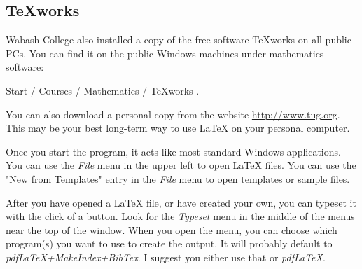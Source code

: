 \documentclass[titlepage]{article}                %
\theoremstyle{definition}
\theoremstyle{remark}
\begin{document}
%
%

\subsection{TeXworks}

Wabash College also installed a copy of the free software TeXworks on all
public PCs.  You can find it on the public Windows machines under mathematics
software: 
\begin{center}
Start / Courses / Mathematics / TeXworks .
\end{center}
You can also download a personal copy from the website
\url{http://www.tug.org}.  This may be your best long-term way to use \LaTeX{}
on your personal computer.

Once you start the program, it acts like most standard Windows applications.
You can use the \emph{File} menu in the upper left to open \LaTeX{} files.
You can use the "New from Templates" entry in the \emph{File} menu to open templates or sample files.

After you have opened a \LaTeX{} file, or have created your own, you can
typeset it with the click of a button.  Look for the \emph{Typeset} menu in the
middle of the menus near the top of the window.  When you open the menu, you can choose which program(s) you want to use to create the output.  It will
probably default to \emph{pdfLaTeX+MakeIndex+BibTex}.  I suggest you either use that or \emph{pdfLaTeX}.
\end{document}

